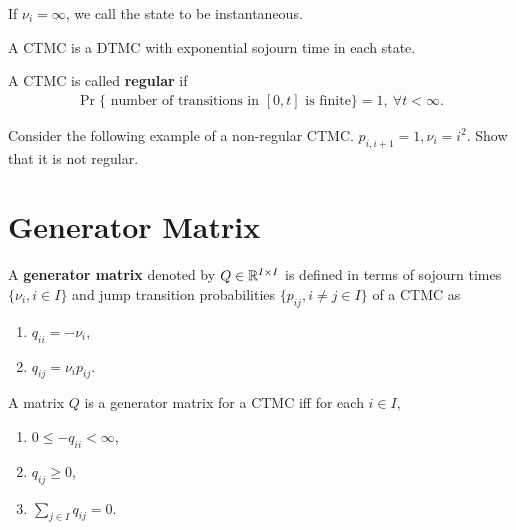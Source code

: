 \documentclass[a4paper,10pt,english]{article}
\begin{document}
\begin{rem} If $\nu_i = \infty$, we call the state to be instantaneous. 
\end{rem}
\begin{rem}  A CTMC is a DTMC with exponential sojourn time in each state.
\end{rem}
\begin{defn} A CTMC is called \textbf{regular} if 
\begin{align*}
\Pr\{ \text{ number of transitions in } [0,t] \text{ is finite}\} = 1,~ \forall t < \infty.
\end{align*} 
\end{defn}
\begin{exmp} Consider the following example of a non-regular CTMC. $p_{i,i+1}=1, \nu_i = i^2$. Show that it is not regular.
\end{exmp}

\section{Generator Matrix}
\begin{defn}
A \textbf{generator matrix} denoted by $Q \in \mathbb{R}^{I \times I}$ is defined in terms of sojourn times $\{\nu_i, i \in I\}$ and jump transition probabilities $\{p_{ij}, i \neq j \in I\}$ of a CTMC as
\begin{enumerate}
\item $q_{ii}= -\nu_i$,
\item $q_{ij}=\nu_i p_{ij}$. 
\end{enumerate}
\end{defn}
\begin{lem} A matrix $Q$ is a generator matrix for a CTMC iff for each $i \in I$,
 \begin{enumerate}
\item $0 \leq -q_{ii} < \infty$, 
\item $q_{ij} \geq 0$,
\item $\sum_{j \in I}q_{ij}=0$.
\end{enumerate}
\end{lem}
\end{document}
